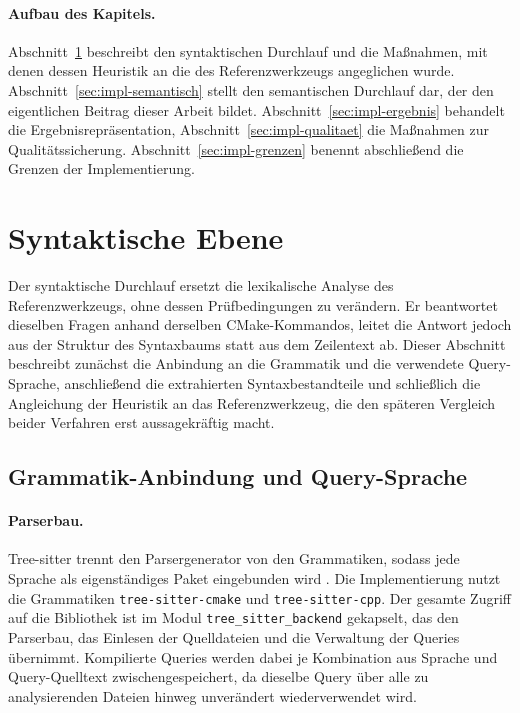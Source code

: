 \documentclass[12pt,a4paper,twoside,headsepline,parskip=half]{scrreprt}
\begin{document}
\paragraph{Aufbau des Kapitels.}
Abschnitt~\ref{sec:impl-syntaktisch} beschreibt den syntaktischen Durchlauf und die
Maßnahmen, mit denen dessen Heuristik an die des Referenzwerkzeugs angeglichen wurde.
Abschnitt~\ref{sec:impl-semantisch} stellt den semantischen Durchlauf dar, der den
eigentlichen Beitrag dieser Arbeit bildet.
Abschnitt~\ref{sec:impl-ergebnis} behandelt die Ergebnisrepräsentation,
Abschnitt~\ref{sec:impl-qualitaet} die Maßnahmen zur Qualitätssicherung.
Abschnitt~\ref{sec:impl-grenzen} benennt abschließend die Grenzen der Implementierung.

\section{Syntaktische Ebene}
\label{sec:impl-syntaktisch}

Der syntaktische Durchlauf ersetzt die lexikalische Analyse des Referenzwerkzeugs,
ohne dessen Prüfbedingungen zu verändern. Er beantwortet dieselben Fragen anhand
derselben CMake-Kommandos, leitet die Antwort jedoch aus der Struktur des Syntaxbaums
statt aus dem Zeilentext ab. Dieser Abschnitt beschreibt zunächst die Anbindung an die
Grammatik und die verwendete Query-Sprache, anschließend die extrahierten
Syntaxbestandteile und schließlich die Angleichung der Heuristik an das
Referenzwerkzeug, die den späteren Vergleich beider Verfahren erst aussagekräftig
macht.

\subsection{Grammatik-Anbindung und Query-Sprache}
\label{sec:impl-grammatik}

\paragraph{Parserbau.}
Tree-sitter trennt den Parsergenerator von den Grammatiken, sodass jede Sprache als
eigenständiges Paket eingebunden wird \cite{treesitter}. Die Implementierung nutzt die
Grammatiken \texttt{tree-sitter-cmake} und \texttt{tree-sitter-cpp}. Der gesamte
Zugriff auf die Bibliothek ist im Modul \texttt{tree\_sitter\_backend} gekapselt, das
den Parserbau, das Einlesen der Quelldateien und die Verwaltung der Queries
übernimmt. Kompilierte Queries werden dabei je Kombination aus Sprache und
Query-Quelltext zwischengespeichert, da dieselbe Query über alle zu analysierenden
Dateien hinweg unverändert wiederverwendet wird.
\end{document}
